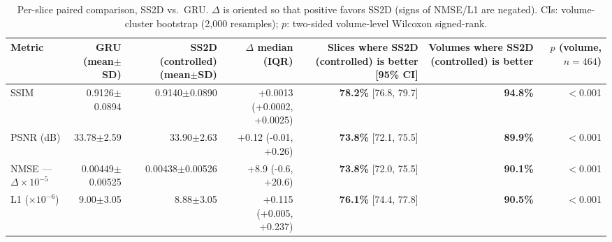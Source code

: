 \begin{table}[ht]
\centering
\caption{Per-slice paired comparison, SS2D vs.\ GRU. $\Delta$ is oriented so that positive favors SS2D (signs of NMSE/L1 are negated). CIs: volume-cluster bootstrap (2{,}000 resamples); $p$: two-sided volume-level Wilcoxon signed-rank.}
\label{tab:paired-v8}
\begin{tabular}{lrrrrrr}
\toprule
Metric & GRU (mean$\pm$SD) & SS2D (controlled) (mean$\pm$SD) & $\Delta$ median (IQR) & Slices where SS2D (controlled) is better [95\% CI] & Volumes where SS2D (controlled) is better & $p$ (volume, $n{=}464$) \\
\midrule
SSIM & 0.9126$\pm$0.0894 & 0.9140$\pm$0.0890 & +0.0013 (+0.0002, +0.0025) & \textbf{78.2\%} [76.8, 79.7] & \textbf{94.8\%} & $<$0.001 \\
PSNR (dB) & 33.78$\pm$2.59 & 33.90$\pm$2.63 & +0.12 (-0.01, +0.26) & \textbf{73.8\%} [72.1, 75.5] & \textbf{89.9\%} & $<$0.001 \\
NMSE --- $\Delta\times 10^{-5}$ & 0.00449$\pm$0.00525 & 0.00438$\pm$0.00526 & +8.9 (-0.6, +20.6) & \textbf{73.8\%} [72.0, 75.5] & \textbf{90.1\%} & $<$0.001 \\
L1 ($\times 10^{-6}$) & 9.00$\pm$3.05 & 8.88$\pm$3.05 & +0.115 (+0.005, +0.237) & \textbf{76.1\%} [74.4, 77.8] & \textbf{90.5\%} & $<$0.001 \\
\bottomrule
\end{tabular}
\end{table}
